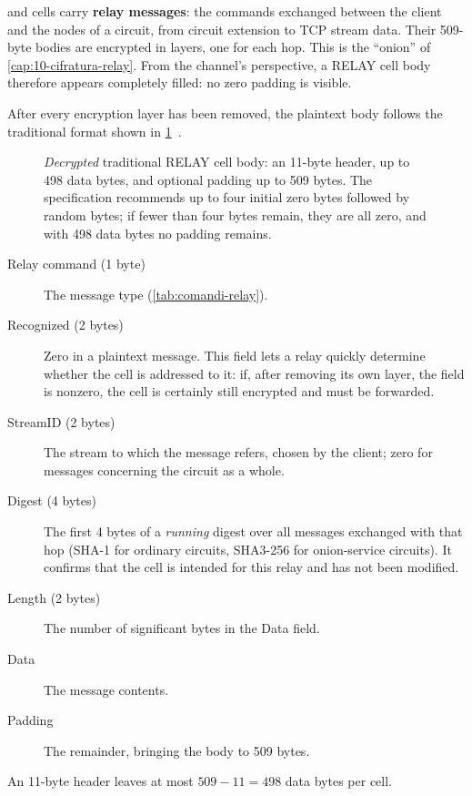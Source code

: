  and  cells carry \textbf{relay messages}: the commands exchanged between the client and the nodes of a circuit, from circuit extension to TCP stream data. Their 509-byte bodies are encrypted in layers, one for each hop. This is the \enquote{onion} of \cref{cap:10-cifratura-relay}. From the channel's perspective, a RELAY cell body therefore appears completely filled: no zero padding is visible.

After every encryption layer has been removed, the plaintext body follows the traditional format shown in \cref{fig:relay}~.

\begin{figure}[htbp]
\centering

\caption{\emph{Decrypted} traditional RELAY cell body: an 11-byte header, up to 498 data bytes, and optional padding up to 509 bytes. The specification recommends up to four initial zero bytes followed by random bytes; if fewer than four bytes remain, they are all zero, and with 498 data bytes no padding remains.}
\label{fig:relay}
\end{figure}

\begin{description}
  \item[Relay command (1 byte)] The message type (\cref{tab:comandi-relay}).
  \item[Recognized (2 bytes)] Zero in a plaintext message. This field lets a relay quickly determine whether the cell is addressed to it: if, after removing its own layer, the field is nonzero, the cell is certainly still encrypted and must be forwarded.
  \item[StreamID (2 bytes)] The stream to which the message refers, chosen by the client; zero for messages concerning the circuit as a whole.
  \item[Digest (4 bytes)] The first 4 bytes of a \emph{running} digest over all messages exchanged with that hop (SHA-1 for ordinary circuits, SHA3-256 for onion-service circuits). It confirms that the cell is intended for this relay and has not been modified.
  \item[Length (2 bytes)] The number of significant bytes in the Data field.
  \item[Data] The message contents.
  \item[Padding] The remainder, bringing the body to 509 bytes.
\end{description}

An 11-byte header leaves at most $509 - 11 = 498$ data bytes per cell.

